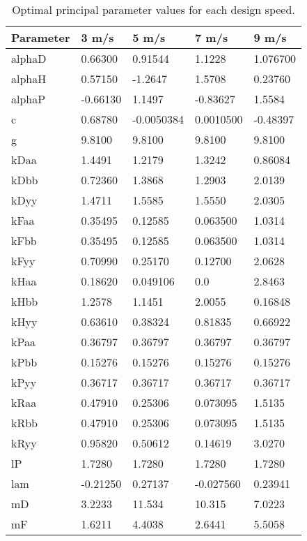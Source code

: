 \documentclass{bmd2019a}
\begin{document}
\begin{table}
  \caption{Optimal principal parameter values for each design speed.}
  \label{tab:optimal-values}
  \centering
  \begin{tabular}{lllll}
    \toprule
    Parameter & 3 m/s & 5 m/s & 7 m/s & 9 m/s \\
    \midrule
alphaD & 0.66300  & 0.91544    & 1.1228    & 1.076700 \\
alphaH & 0.57150  & -1.2647 &    1.5708    & 0.23760 \\
alphaP & -0.66130 & 1.1497 &     -0.83627  & 1.5584 \\
c      & 0.68780  & -0.0050384 & 0.0010500 & -0.48397 \\
g      & 9.8100   & 9.8100 &     9.8100 &    9.8100 \\
kDaa   & 1.4491   & 1.2179 &     1.3242 &    0.86084 \\
kDbb   & 0.72360  & 1.3868 &     1.2903 &    2.0139 \\
kDyy   & 1.4711   & 1.5585 &     1.5550 &    2.0305 \\
kFaa   & 0.35495  & 0.12585 &    0.063500 &  1.0314 \\
kFbb   & 0.35495  & 0.12585 &    0.063500 &  1.0314 \\
kFyy   & 0.70990  & 0.25170 &    0.12700 &   2.0628 \\
kHaa   & 0.18620  & 0.049106 &   0.0 &       2.8463 \\
kHbb   & 1.2578   & 1.1451 &     2.0055 &    0.16848 \\
kHyy   & 0.63610  & 0.38324 &    0.81835 &   0.66922 \\
kPaa   & 0.36797  & 0.36797 &    0.36797 &   0.36797 \\
kPbb   & 0.15276  & 0.15276 &    0.15276 &   0.15276 \\
kPyy   & 0.36717  & 0.36717 &    0.36717 &   0.36717 \\
kRaa   & 0.47910  & 0.25306 &    0.073095 &  1.5135 \\
kRbb   & 0.47910  & 0.25306 &    0.073095 &  1.5135 \\
kRyy   & 0.95820  & 0.50612 &    0.14619 &   3.0270 \\
lP     & 1.7280   & 1.7280 &     1.7280 &    1.7280 \\
lam    & -0.21250 & 0.27137 &    -0.027560 & 0.23941 \\
mD     & 3.2233   & 11.534 &     10.315 &    7.0223 \\
mF     & 1.6211   & 4.4038 &     2.6441 &    5.5058 \\

\end{tabular}
\end{table}
\end{document}
